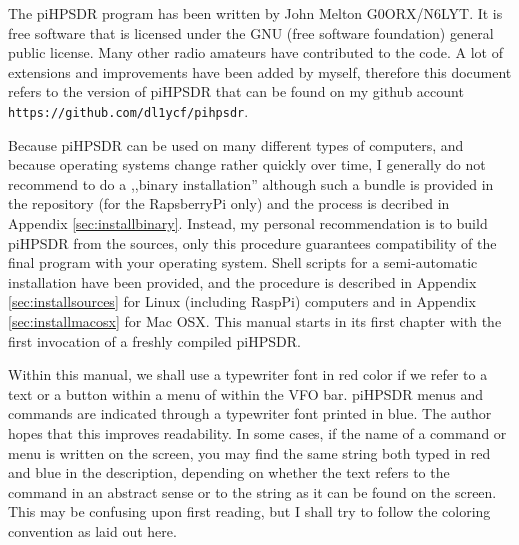 \documentclass[12pt]{book}
\begin{document}
The piHPSDR program has been written by John Melton G0ORX/N6LYT. It is free software that is licensed under
the GNU (free software foundation) general public license. Many other radio amateurs have contributed to
the code. A lot of extensions and improvements have been added by myself, therefore this document refers
to the version of piHPSDR that can be found on my github account \texttt{https://github.com/dl1ycf/pihpsdr}.

Because piHPSDR can be used on many different types of computers, and because operating systems change
rather quickly over time, I generally do not recommend to do a ,,binary installation'' although such
a bundle is provided in the repository (for the RapsberryPi only) and the process is decribed in Appendix
 \ref{sec:installbinary}.
 Instead, my personal recommendation is to build piHPSDR
from the sources, only this procedure guarantees compatibility of the final program with your
operating system. Shell scripts for a semi-automatic installation have been provided,
and the procedure is described in Appendix \ref{sec:installsources} for Linux (including RaspPi)
computers and in Appendix \ref{sec:installmacosx} for Mac OSX.
This manual starts in its first chapter with the first invocation of a freshly compiled piHPSDR.

Within this manual, we shall use a typewriter font in red color if we refer to a text or a button within
a menu of within the VFO bar. piHPSDR menus and commands are indicated through a typewriter font
printed in blue. The author hopes that this improves readability. In some cases, if the name of a command
or  menu is written on the screen, you may find the same string both typed in red and blue in the
description, depending on whether the text refers to the command in an abstract sense or to the string as it
can be found on the screen. This may be confusing upon first reading, but I shall try to follow the coloring
 convention as laid out here.

\end{document}
